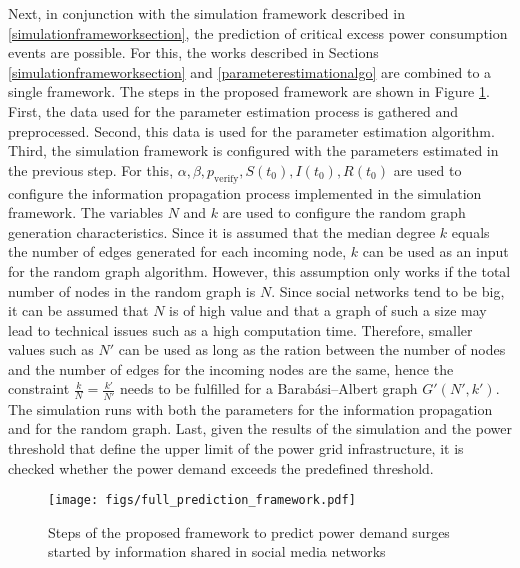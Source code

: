 Next, in conjunction with the simulation framework described in 
\ref{simulationframeworksection}, the prediction of
critical excess power consumption events are possible. 
For this, the works described in Sections \ref{simulationframeworksection} 
and \ref{parameterestimationalgo} are combined to a single framework.
The steps in the proposed framework are shown in 
Figure \ref{basicpredicitonframework}.
First, the data used for the parameter estimation process is gathered and
preprocessed. Second, this data is used for the parameter estimation algorithm. 
Third, the simulation framework is configured
with the parameters estimated in the previous step. For this, 
$\alpha, \beta, p_{{\mathrm{verify}}}, S(t_0), I(t_0), R(t_0)$ 
are used to configure the 
information propagation process implemented in the simulation framework.
The variables $N$ and $k$ are used to configure the random graph generation
characteristics. Since it is assumed that the median degree
$k$ equals the number of edges generated for each incoming node,
$k$ can be used as an input for the random graph algorithm. 
However, this assumption
only works if the total number of nodes in the random graph is $N$.
Since social networks tend to be big, it can be assumed that 
$N$ is of high value and that a graph of such a size may lead to technical 
issues such as a high computation time. Therefore, smaller values such as $N'$
can be used as long as the ration between the number of nodes and the
number of edges for the incoming nodes are the same, hence the constraint
$\frac{k}{N}=\frac{k'}{N'}$ needs to be fulfilled for a Barabási–Albert
graph $G'(N',k')$. The simulation runs with both
the parameters for the information propagation and for the random graph. 
Last, given the results of the simulation and the power threshold
that define the upper limit of the power grid infrastructure, it
is checked whether the power demand exceeds the predefined threshold.


\begin{figure}[!ht]
    \center
    \texttt{[image: figs/full\_prediction\_framework.pdf]}
    \caption{Steps of the proposed framework to predict power demand surges
    started by information shared in social media networks}
    \label{basicpredicitonframework}
\end{figure}



